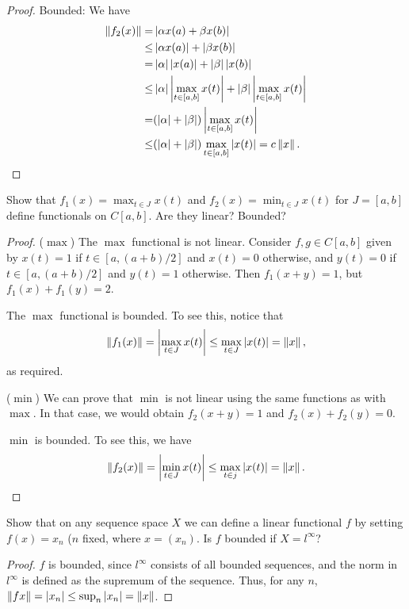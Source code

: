 \begin{proof}
Bounded:
We have
\begin{align*}
    \left\lVert f_2(x)\right\rVert
    =& \left\lvert \alpha x(a) +\beta x(b)\right\rvert\\
    \leq& \left\lvert \alpha x(a)\right\rvert 
    +\left\lvert \beta x(b)\right\rvert\\
    =& \left\lvert \alpha\right\rvert\left\lvert x(a)\right\rvert 
    +\left\lvert \beta\right\rvert\left\lvert x(b)\right\rvert\\
    \leq& \left\lvert \alpha\right\rvert\left\lvert \max_{t\in [a,b]}x(t)\right\rvert 
    +\left\lvert \beta\right\rvert\left\lvert \max_{t\in [a,b]}x(t)\right\rvert\\
    =& (\left\lvert \alpha\right\rvert+\left\lvert \beta\right\rvert)\left\lvert \max_{t\in [a,b]}x(t)\right\rvert\\
    \leq& (\left\lvert \alpha\right\rvert+\left\lvert \beta\right\rvert)\max_{t\in [a,b]}\left\lvert x(t)\right\rvert = c\left\lVert x\right\rVert.
\end{align*}
\end{proof}

\begin{exercise}{4}
Show that $f_1(x)=\max_{t\in J} x(t)$ and $f_2(x)=\min_{t\in J} x(t)$ for $J=[a,b]$ define functionals on $C[a,b]$. 
Are they linear? Bounded?
\end{exercise}
\begin{proof}
($\max$)
The $\max$ functional is not linear.
Consider $f,g\in C[a,b]$ given by $x(t)=1$ if $t\in[a,(a+b)/2]$ and $x(t)=0$ otherwise, and $y(t)=0$ if $t\in[a,(a+b)/2]$ and $y(t)=1$ otherwise.
Then $f_1(x+y)=1$, but $f_1(x)+f_1(y)=2$.

The $\max$ functional is bounded.
To see this, notice that 
\begin{align*}
\left\lVert f_1(x)\right\rVert =\left\lvert \max_{t\in J}x(t)\right\rvert \leq\max_{t\in J}\left\lvert x(t)\right\rvert =\left\lVert x\right\rVert,    
\end{align*}
as required.

($\min$)
We can prove that $\min$ is not linear using the same functions as with $\max$.
In that case, we would obtain $f_2(x+y) =1$ and $f_2(x)+f_2(y)=0$.

$\min$ is bounded.
To see this, we have 
\begin{align*}
    \left\lVert f_2(x)\right\rVert 
    =\left\lvert \min_{t\in J}x(t)\right\rvert 
    \leq \max_{t\in j}\left\lvert x(t)\right\rvert
    =\left\lVert x\right\rVert.
\end{align*}
\end{proof}

\begin{exercise}{5}
Show that on any sequence space $X$ we can define a linear functional $f$ by setting $f(x)=x_n$ ($n$ fixed, where $x=(x_n)$. 
Is $f$ bounded if $X=l^\infty$?
\end{exercise}
\begin{proof}
$f$ is bounded, since $l^\infty$ consists of all bounded sequences, and the norm in $l^\infty$ is defined as the supremum of the sequence.
Thus, for any $n$, $\left\lVert fx\right\rVert =\left\lvert x_n\right\rvert\leq \sup_n\left\lvert x_n\right\rvert =\left\lVert x\right\rVert$.
\end{proof}

